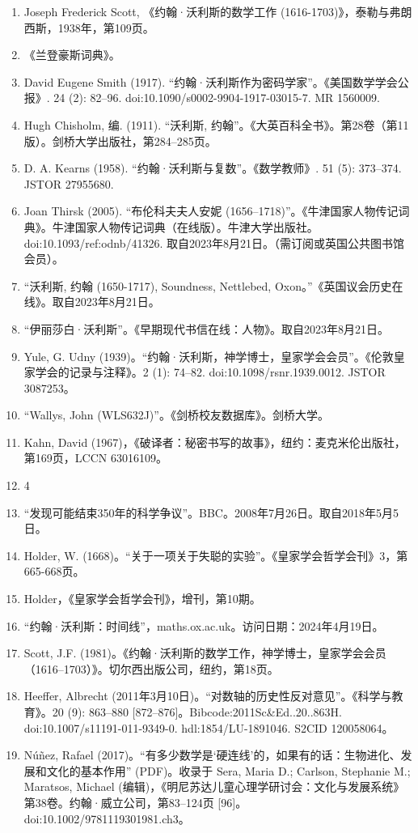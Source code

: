 \begin{enumerate}
\item Joseph Frederick Scott, 《约翰·沃利斯的数学工作 (1616-1703)》，泰勒与弗朗西斯，1938年，第109页。
\item 《兰登豪斯词典》。
\item  David Eugene Smith (1917). “约翰·沃利斯作为密码学家”。《美国数学学会公报》. 24 (2): 82–96. doi:10.1090/s0002-9904-1917-03015-7. MR 1560009.
\item Hugh Chisholm, 编. (1911). “沃利斯, 约翰”。《大英百科全书》。第28卷（第11版）。剑桥大学出版社，第284–285页。
\item D. A. Kearns (1958). “约翰·沃利斯与复数”。《数学教师》. 51 (5): 373–374. JSTOR 27955680.
\item Joan Thirsk (2005). “布伦科夫夫人安妮 (1656–1718)”。《牛津国家人物传记词典》。牛津国家人物传记词典（在线版）。牛津大学出版社。doi:10.1093/ref:odnb/41326. 取自2023年8月21日。（需订阅或英国公共图书馆会员）。
\item “沃利斯, 约翰 (1650-1717), Soundness, Nettlebed, Oxon。”《英国议会历史在线》。取自2023年8月21日。
\item “伊丽莎白·沃利斯”。《早期现代书信在线：人物》。取自2023年8月21日。
\item Yule, G. Udny (1939)。“约翰·沃利斯，神学博士，皇家学会会员”。《伦敦皇家学会的记录与注释》。2 (1): 74–82. doi:10.1098/rsnr.1939.0012. JSTOR 3087253。
\item “Wallys, John (WLS632J)”。《剑桥校友数据库》。剑桥大学。
\item Kahn, David (1967)，《破译者：秘密书写的故事》，纽约：麦克米伦出版社，第169页，LCCN 63016109。
\item 4
\item “发现可能结束350年的科学争议”。BBC。2008年7月26日。取自2018年5月5日。
\item Holder, W. (1668)。“关于一项关于失聪的实验”。《皇家学会哲学会刊》3，第665-668页。
\item Holder，《皇家学会哲学会刊》，增刊，第10期。
\item “约翰·沃利斯：时间线”，maths.ox.ac.uk。访问日期：2024年4月19日。
\item Scott, J.F. (1981)。《约翰·沃利斯的数学工作，神学博士，皇家学会会员（1616–1703）》。切尔西出版公司，纽约，第18页。
\item Heeffer, Albrecht (2011年3月10日)。“对数轴的历史性反对意见”。《科学与教育》。20 (9): 863–880 [872–876]。Bibcode:2011Sc&Ed..20..863H. doi:10.1007/s11191-011-9349-0. hdl:1854/LU-1891046. S2CID 120058064。
\item Núñez, Rafael (2017)。“有多少数学是‘硬连线’的，如果有的话：生物进化、发展和文化的基本作用” (PDF)。收录于 Sera, Maria D.; Carlson, Stephanie M.; Maratsos, Michael (编辑)，《明尼苏达儿童心理学研讨会：文化与发展系统》第38卷。约翰·威立公司，第83–124页 [96]。doi:10.1002/9781119301981.ch3。

\end{enumerate}
